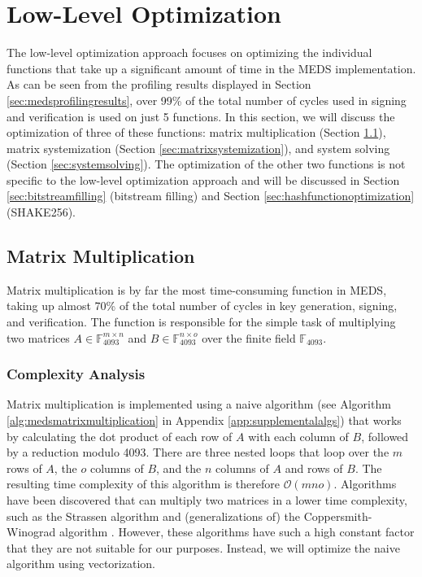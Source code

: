 \documentclass[11pt,a4paper]{report}
\theoremstyle{definition}
\begin{document}
\section{Low-Level Optimization}
\label{sec:lowleveloptimization}
The low-level optimization approach focuses on optimizing the individual functions that take up a significant amount of time in the MEDS implementation. As can be seen from the profiling results displayed in Section \ref{sec:medsprofilingresults}, over 99\% of the total number of cycles used in signing and verification is used on just 5 functions. In this section, we will discuss the optimization of three of these functions: matrix multiplication (Section \ref{sec:matrixmultiplication}), matrix systemization (Section \ref{sec:matrixsystemization}), and system solving (Section \ref{sec:systemsolving}). The optimization of the other two functions is not specific to the low-level optimization approach and will be discussed in Section \ref{sec:bitstreamfilling} (bitstream filling) and Section \ref{sec:hashfunctionoptimization} (SHAKE256).

\subsection{Matrix Multiplication}
\label{sec:matrixmultiplication}
Matrix multiplication is by far the most time-consuming function in MEDS, taking up almost 70\% of the total number of cycles in key generation, signing, and verification. The function is responsible for the simple task of multiplying two matrices $A \in \mathbb{F}_{4093}^{m \times n}$ and $B \in \mathbb{F}_{4093}^{n \times o}$ over the finite field $\mathbb{F}_{4093}$.

\subsubsection{Complexity Analysis}
\label{sec:matrixmultiplicationcomplexity}
Matrix multiplication is implemented using a naive algorithm (see Algorithm \ref{alg:medsmatrixmultiplication} in Appendix \ref{app:supplementalalgs}) that works by calculating the dot product of each row of $A$ with each column of $B$, followed by a reduction modulo 4093. There are three nested loops that loop over the $m$ rows of $A$, the $o$ columns of $B$, and the $n$ columns of $A$ and rows of $B$. The resulting time complexity of this algorithm is therefore $\mathcal{O}(mno)$. Algorithms have been discovered that can multiply two matrices in a lower time complexity, such as the Strassen algorithm \cite{strassen1969gaussian} and (generalizations of) the Coppersmith-Winograd algorithm \cite{coppersmith1987matrix}. However, these algorithms have such a high constant factor that they are not suitable for our purposes. Instead, we will optimize the naive algorithm using vectorization.
\end{document}
